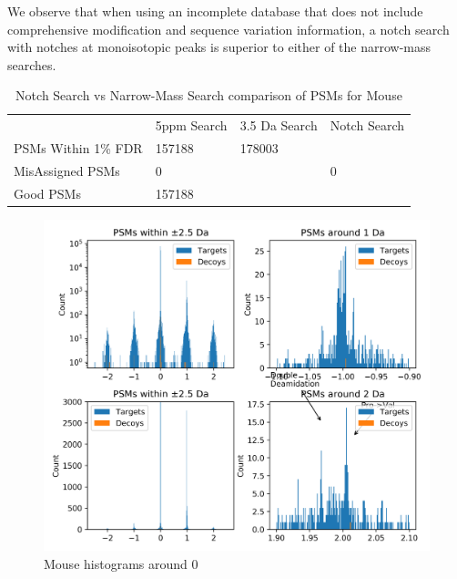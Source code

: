 \documentclass[journal=jprobs,manuscript=article]{achemso}
\begin{document}
We observe that when using an incomplete database that does not include comprehensive modification and sequence variation information, a notch search with notches at monoisotopic peaks is superior to either of the narrow-mass searches.

\begin{table}[]
\centering
\caption{Notch Search vs Narrow-Mass Search comparison of PSMs for Mouse}
\label{my-label}
\begin{tabular}{@{}llll@{}}
                    & 5ppm Search & 3.5 Da Search & Notch Search \\ \cmidrule(l){2-4}
PSMs Within 1\% FDR & 157188      & 178003        &        \\
MisAssigned PSMs    & 0           &               & 0            \\
Good PSMs           & 157188      &         &        \\ 
\end{tabular}
\end{table}

\begin{figure}
\caption{Mouse histograms around 0}
\label{fig:fig3mouse-1012}
\includegraphics{fig3mouse-1012}
\end{figure}
\end{document}
